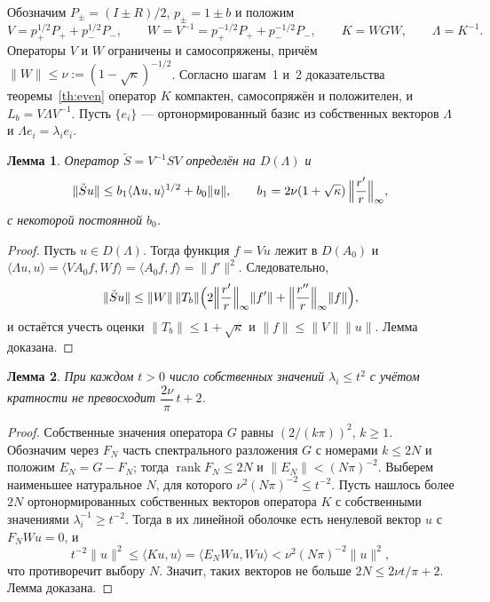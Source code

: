 \documentclass[12pt,a4paper]{article}
\newtheorem{lemma}{Лемма}
\theoremstyle{definition}
\newcommand{\norm}[1]{\lVert#1\rVert}
\newcommand{\inner}[2]{\langle#1,#2\rangle}
\begin{document}
Обозначим $P_\pm=(I\pm R)/2$, $p_\pm=1\pm b$ и положим
\[
 V=p_+^{1/2}P_++p_-^{1/2}P_-,\qquad W=V^{-1}=p_+^{-1/2}P_++p_-^{-1/2}P_-,\qquad
 K=WGW,\qquad\Lambda=K^{-1}.
\]
Операторы $V$ и $W$ ограничены и самосопряжены, причём
$\norm W\le\nu:=(1-\sqrt\kappa)^{-1/2}$. Согласно шагам~1 и~2 доказательства
теоремы~\ref{th:even} оператор $K$ компактен, самосопряжён и положителен, и
$L_b=V\Lambda V^{-1}$. Пусть $\{e_i\}$ --- ортонормированный базис из собственных
векторов $\Lambda$ и $\Lambda e_i=\lambda_ie_i$.

\begin{lemma}\label{lem:sub}
Оператор $\tilde S=V^{-1}SV$ определён на $D(\Lambda)$ и
\begin{equation}\label{eq:sub}
 \norm{\tilde Su}\le b_1\inner{\Lambda u}{u}^{1/2}+b_0\norm u,\qquad
 b_1=2\nu(1+\sqrt\kappa)\,\Bigl\lVert\frac{r'}r\Bigr\rVert_\infty ,
\end{equation}
с некоторой постоянной $b_0$.
\end{lemma}
\begin{proof}
Пусть $u\in D(\Lambda)$. Тогда функция $f=Vu$ лежит в $D(A_0)$ и
$\inner{\Lambda u}{u}=\inner{VA_0f}{Wf}=\inner{A_0f}{f}=\norm{f'}^2$. Следовательно,
\[
 \norm{\tilde Su}\le\norm W\,\norm{T_b}\Bigl(2\Bigl\lVert\frac{r'}r\Bigr\rVert_\infty
 \norm{f'}+\Bigl\lVert\frac{r''}r\Bigr\rVert_\infty\norm f\Bigr),
\]
и остаётся учесть оценки $\norm{T_b}\le1+\sqrt\kappa$ и $\norm f\le\norm V\norm u$.
Лемма доказана.
\end{proof}

\begin{lemma}\label{lem:count}
При каждом $t>0$ число собственных значений $\lambda_i\le t^2$ с учётом кратности не
превосходит $\dfrac{2\nu}{\pi}\,t+2$.
\end{lemma}
\begin{proof}
Собственные значения оператора $G$ равны $(2/(k\pi))^2$, $k\ge1$. Обозначим через $F_N$
часть спектрального разложения $G$ с номерами $k\le2N$ и положим $E_N=G-F_N$; тогда
$\operatorname{rank}F_N\le2N$ и $\norm{E_N}<(N\pi)^{-2}$. Выберем наименьшее натуральное
$N$, для которого $\nu^2(N\pi)^{-2}\le t^{-2}$. Пусть нашлось более $2N$ ортонормированных
собственных векторов оператора $K$ с собственными значениями
$\lambda_i^{-1}\ge t^{-2}$. Тогда в их линейной оболочке есть ненулевой вектор $u$ с
$F_NWu=0$, и
\[
 t^{-2}\norm u^2\le\inner{Ku}{u}=\inner{E_NWu}{Wu}<\nu^2(N\pi)^{-2}\norm u^2 ,
\]
что противоречит выбору $N$. Значит, таких векторов не больше $2N\le2\nu t/\pi+2$.
Лемма доказана.
\end{proof}
\end{document}
